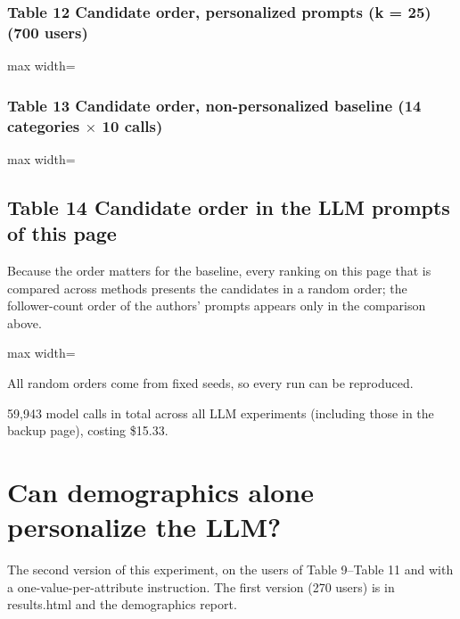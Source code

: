 \documentclass[10pt]{article}
\begin{document}
\subsubsection*{Table 12 \textperiodcentered{} Candidate order, personalized prompts (k = 25) (700 users)}
\begin{center}\begin{adjustbox}{max width=\linewidth}

\end{adjustbox}\end{center}

\subsubsection*{Table 13 \textperiodcentered{} Candidate order, non-personalized baseline (14 categories $\times$ 10 calls)}
\begin{center}\begin{adjustbox}{max width=\linewidth}

\end{adjustbox}\end{center}

\subsection*{Table 14 \textperiodcentered{} Candidate order in the LLM prompts of this page}
Because the order matters for the baseline, every ranking on this page that is compared across methods presents the candidates in a random order; the follower-count order of the authors' prompts appears only in the comparison above.

\begin{center}\begin{adjustbox}{max width=\linewidth}

\end{adjustbox}\end{center}

{\small All random orders come from fixed seeds, so every run can be reproduced.}

{\small 59,943 model calls in total across all LLM experiments (including those in the backup page), costing \$15.33.}

\section{Can demographics alone personalize the LLM?}
The second version of this experiment, on the users of Table 9--Table 11 and with a one-value-per-attribute instruction. The first version (270 users) is in results.html and the demographics report.
\end{document}
